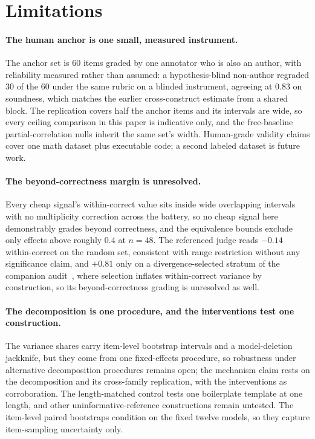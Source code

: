 \documentclass[11pt]{article}
\begin{document}
\section{Limitations}
\label{sec:limits}

\paragraph{The human anchor is one small, measured instrument.}
The anchor set is 60 items graded by one annotator who is also an author, with reliability measured rather than assumed: a hypothesis-blind non-author regraded 30 of the 60 under the same rubric on a blinded instrument, agreeing at $0.83$ on soundness, which matches the earlier cross-construct estimate from a shared block.
The replication covers half the anchor items and its intervals are wide, so every ceiling comparison in this paper is indicative only, and the free-baseline partial-correlation nulls inherit the same set's width.
Human-grade validity claims cover one math dataset plus executable code; a second labeled dataset is future work.

\paragraph{The beyond-correctness margin is unresolved.}
Every cheap signal's within-correct value sits inside wide overlapping intervals with no multiplicity correction across the battery, so no cheap signal here demonstrably grades beyond correctness, and the equivalence bounds exclude only effects above roughly $0.4$ at $n{=}48$.
The referenced judge reads $-0.14$ within-correct on the random set, consistent with range restriction without any significance claim, and $+0.81$ only on a divergence-selected stratum of the companion audit~\cite{companionA}, where selection inflates within-correct variance by construction, so its beyond-correctness grading is unresolved as well.

\paragraph{The decomposition is one procedure, and the interventions test one construction.}
The variance shares carry item-level bootstrap intervals and a model-deletion jackknife, but they come from one fixed-effects procedure, so robustness under alternative decomposition procedures remains open; the mechanism claim rests on the decomposition and its cross-family replication, with the interventions as corroboration.
The length-matched control tests one boilerplate template at one length, and other uninformative-reference constructions remain untested.
The item-level paired bootstraps condition on the fixed twelve models, so they capture item-sampling uncertainty only.
\end{document}
